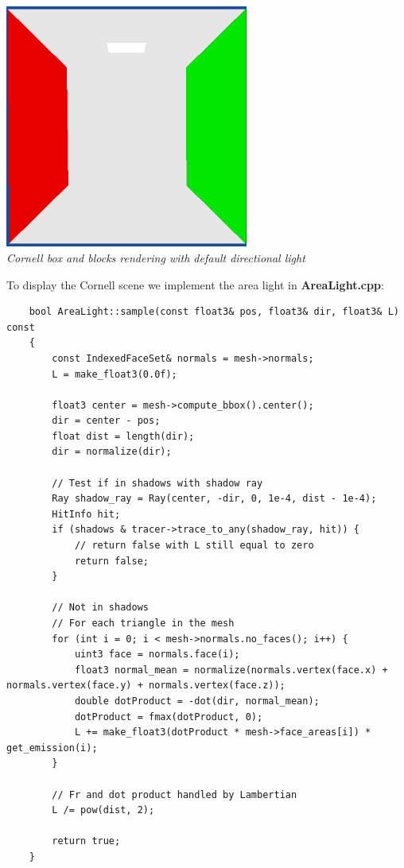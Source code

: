\documentclass[a4,12pt]{article}
\begin{document}
	\begin{center}
		\includegraphics[width=8cm]{./Worksheet4/cornellblocks_flat.png}\\
		\textit{Cornell box and blocks rendering with default directional light}
	\end{center}
	
	To display the Cornell scene we implement the area light in \textbf{AreaLight.cpp}:
	
	\begin{lstlisting}
	bool AreaLight::sample(const float3& pos, float3& dir, float3& L) const
	{
		const IndexedFaceSet& normals = mesh->normals;
		L = make_float3(0.0f);
		
		float3 center = mesh->compute_bbox().center();
		dir = center - pos;
		float dist = length(dir);
		dir = normalize(dir);
		
		// Test if in shadows with shadow ray
		Ray shadow_ray = Ray(center, -dir, 0, 1e-4, dist - 1e-4);
		HitInfo hit;
		if (shadows & tracer->trace_to_any(shadow_ray, hit)) {
			// return false with L still equal to zero
			return false;
		}
		
		// Not in shadows
		// For each triangle in the mesh
		for (int i = 0; i < mesh->normals.no_faces(); i++) {
			uint3 face = normals.face(i);
			float3 normal_mean = normalize(normals.vertex(face.x) + normals.vertex(face.y) + normals.vertex(face.z));
			double dotProduct = -dot(dir, normal_mean);
			dotProduct = fmax(dotProduct, 0);
			L += make_float3(dotProduct * mesh->face_areas[i]) * get_emission(i);
		}
		
		// Fr and dot product handled by Lambertian
		L /= pow(dist, 2);
		
		return true;
	}
	\end{lstlisting}
	
\end{document}
